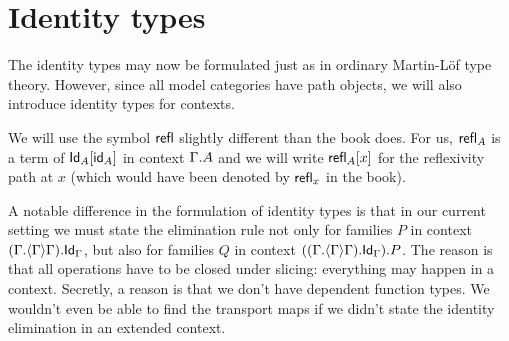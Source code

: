 \section{Identity types}
The identity types may now be formulated just as in ordinary Martin\nobreakdash-L\"of
type theory. However, since all model categories have path objects, we will also
introduce identity types for contexts.

We will use the symbol ${\mathsf{refl}}$ slightly different than the book does. For us,
$\mathsf{refl}_{A}$ is a term of $\subst{\idfunc[A]}{\idtypevar{A}}$ in context
$\ctxext{\Gamma}{A}$ and we will write $\subst{x}{\refl{A}}$ for the reflexivity
path at $x$ (which would have been denoted by $\mathsf{refl}_{x}$ in the book).

A notable difference in the formulation of identity types is that in our current
setting we must state the elimination rule not only for families $P$ in context
$\ctxext{{\Gamma}{\ctxwk{\Gamma}{\Gamma}}}{\idtypevar{\Gamma}}$,
but also for families $Q$ in context 
$\ctxext{{{\Gamma}{\ctxwk{\Gamma}{\Gamma}}}{\idtypevar{\Gamma}}}{P}$. The reason
is that all operations have to be closed under slicing: everything may happen
in a context. Secretly, a reason is that we don't have dependent function types.
We wouldn't even be able to find the transport maps if we didn't state the
identity elimination in an extended context.

